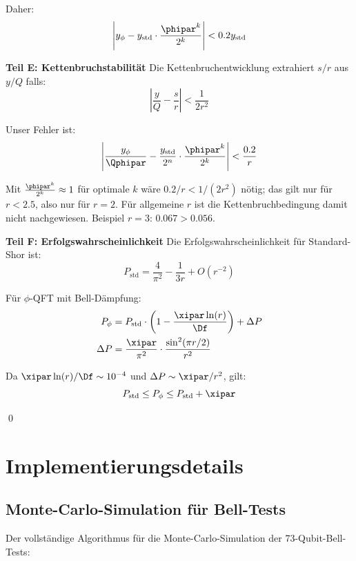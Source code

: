 Daher:
\[
\left| y_{\phi} - y_{\text{std}} \cdot \frac{\phipar^k}{2^k} \right| < 0.2 y_{\text{std}}
\]

\textbf{Teil E: Kettenbruchstabilität}
Die Kettenbruchentwicklung extrahiert $s/r$ aus $y/Q$ falls:
\[
\left| \frac{y}{Q} - \frac{s}{r} \right| < \frac{1}{2r^2}
\]

Unser Fehler ist:
\[
\left| \frac{y_{\phi}}{\Qphipar} - \frac{y_{\text{std}}}{2^n} \cdot \frac{\phipar^k}{2^k} \right| < \frac{0.2}{r}
\]

Mit $\frac{\phipar^k}{2^k} \approx 1$ für optimale $k$ wäre $0.2/r < 1/(2r^2)$ nötig; das gilt nur für $r < 2.5$, also nur für $r = 2$. Für allgemeine $r$ ist die Kettenbruchbedingung damit nicht nachgewiesen. Beispiel $r = 3$: $0.067 > 0.056$.

\textbf{Teil F: Erfolgswahrscheinlichkeit}
Die Erfolgswahrscheinlichkeit für Standard-Shor ist:
\[
P_{\text{std}} = \frac{4}{\pi^2} - \frac{1}{3r} + O(r^{-2})
\]

Für $\phi$-QFT mit Bell-Dämpfung:
\begin{align*}
	P_{\phi} &= P_{\text{std}} \cdot \left(1 - \frac{\xipar \ln(r)}{\Df}\right) + \Delta P \\
	\Delta P &= \frac{\xipar}{\pi^2} \cdot \frac{\sin^2(\pi r/2)}{r^2}
\end{align*}

Da $\xipar \ln(r)/\Df \sim 10^{-4}$ und $\Delta P \sim \xipar/r^2$, gilt:
\[
P_{\text{std}} \leq P_{\phi} \leq P_{\text{std}} + \xipar
\]

\qed

\section{Implementierungsdetails}
\label{app:implementation}

\subsection{Monte-Carlo-Simulation für Bell-Tests}
\label{app:monte_carlo}

Der vollständige Algorithmus für die Monte-Carlo-Simulation der 73-Qubit-Bell-Tests:

